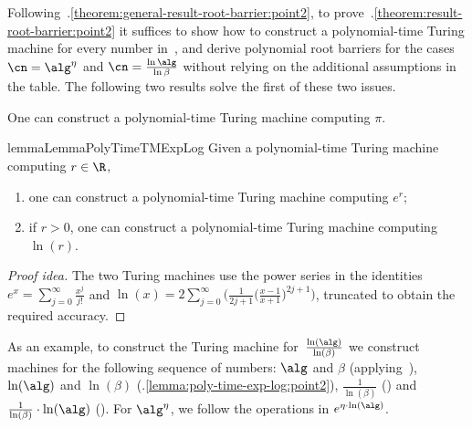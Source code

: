 Following~.\ref{theorem:general-result-root-barrier:point2},
to
prove~.\ref{theorem:result-root-barrier:point2}
it suffices to show how to construct a polynomial-time Turing machine for every
number in~, and derive polynomial root
barriers for the cases $\cn = \alg^{\eta}$ and $\cn = \frac{\ln{\alg}}{\ln
\beta}$ without relying on the additional assumptions in the table. The
following two results solve the first of these two issues.

\begin{theorem}\label{lemma:poly-time-pi}
  One can construct a polynomial-time Turing machine computing $\pi$.
\end{theorem}

\vspace{-5pt}

\begin{restatable}{lemma}{LemmaPolyTimeTMExpLog}
  \label{lemma:poly-time-exp-log}
  Given a polynomial-time Turing machine computing $r \in \R$,
  \begin{enumerate}
    \item\label{lemma:poly-time-exp-log:point1} one can construct a polynomial-time Turing machine computing $e^r$;
    \item\label{lemma:poly-time-exp-log:point2} if $r > 0$, one can construct a polynomial-time Turing machine computing $\ln(r)$.
  \end{enumerate}

\end{restatable}

\begin{proof}[Proof idea]
  The two Turing machines use the power series in the
  identities $e^x = \sum_{j=0}^\infty \frac{x^j}{j!}$ and $\ln(x) = 2
  \sum_{j=0}^\infty \big(\frac{1}{2j+1} \big(\frac{x-1}{x+1}\big)^{2j+1}\big)$,
  truncated to obtain the required accuracy. 
\end{proof}

As an example, to construct the Turing machine for~$\frac{\ln(\alg)}{\ln(\beta)}$ 
we construct machines for the following sequence of numbers: $\alg$ and $\beta$ (applying~), $\ln(\alg)$ and $\ln(\beta)$ (.\ref{lemma:poly-time-exp-log:point2}), $\frac{1}{\ln(\beta)}$ ()
and $\frac{1}{\ln(\beta)} \cdot \ln(\alg)$ (). 
For $\alg^\eta$, we follow the operations in $e^{\eta \cdot \ln(\alg)}$.


